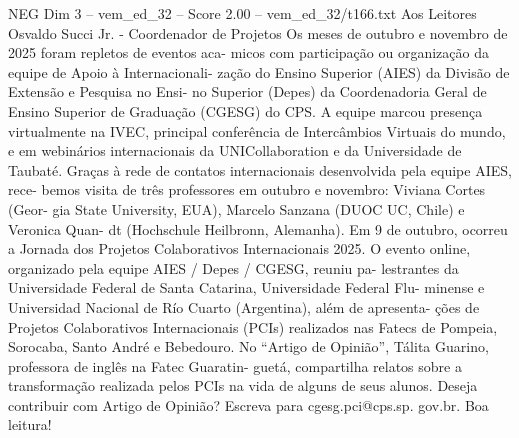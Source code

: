 \begin{textsample}{NEG Dim 3 – vem\_ed\_32 – Score 2.00 – vem\_ed\_32/t166.txt}  \label{ex:f3_neg_145}
Aos Leitores Osvaldo Succi Jr. - Coordenador de Projetos Os meses de outubro e novembro de 2025 foram repletos de eventos aca- micos com participação ou organização da equipe de Apoio à Internacionali- zação do Ensino Superior (AIES) da Divisão de Extensão e Pesquisa no Ensi- no Superior (Depes) da Coordenadoria Geral de Ensino Superior de Graduação (CGESG) do CPS.
A equipe marcou presença virtualmente na IVEC, principal conferência de Intercâmbios Virtuais do mundo, e em webinários internacionais da UNICollaboration e da Universidade de Taubaté.
Graças à rede de contatos internacionais desenvolvida pela equipe AIES, rece- bemos visita de três professores em outubro e novembro: Viviana Cortes (Geor- gia State University, EUA), Marcelo Sanzana (DUOC UC, Chile) e Veronica Quan- dt (Hochschule Heilbronn, Alemanha).
Em 9 de outubro, ocorreu a Jornada dos Projetos Colaborativos Internacionais 2025.
O evento online, organizado pela equipe AIES / Depes / CGESG, reuniu pa- lestrantes da Universidade Federal de Santa Catarina, Universidade Federal Flu- minense e Universidad Nacional de Río Cuarto (Argentina), além de apresenta- ções de Projetos Colaborativos Internacionais (PCIs) realizados nas Fatecs de Pompeia, Sorocaba, Santo André e Bebedouro.
No “Artigo de Opinião”, Tálita Guarino, professora de inglês na Fatec Guaratin- guetá, compartilha relatos sobre a transformação realizada pelos PCIs na vida de alguns de seus alunos.
Deseja contribuir com Artigo de Opinião?
Escreva para cgesg.pci@cps.sp. gov.br.
Boa leitura!

\end{textsample}
